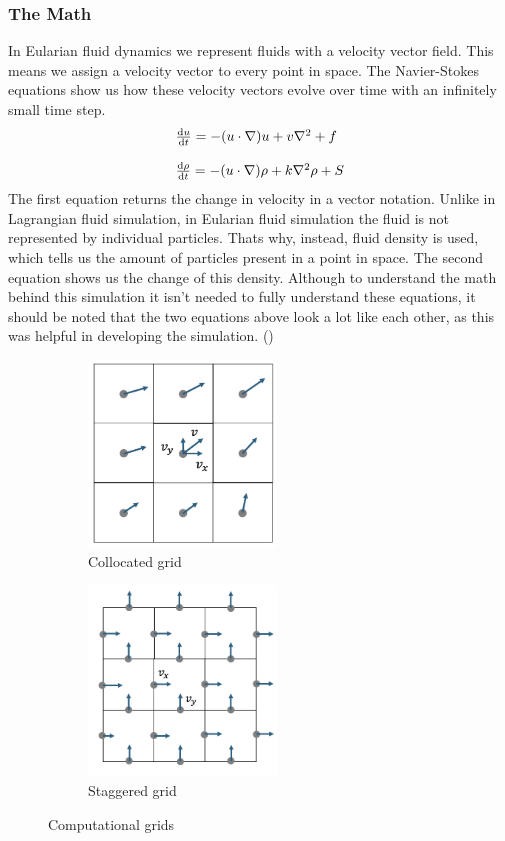 \documentclass[a4paper,12pt]{article}
\begin{document}
\subsubsection{The Math} \label{math}
In Eularian fluid dynamics we represent fluids with a velocity vector field. This means we assign a velocity vector to every point in space.
The Navier-Stokes equations show us how these velocity vectors evolve over time with an infinitely small time step.
\[
\begin{array}{ll}
	\dv{u}{t} = -(u \cdot \nabla)u + v\nabla^2 + f \\
  \\
  \dv{\rho}{t} = -(u \cdot \nabla)\rho + k\nabla^2\rho + S
\end{array}
\]
The first equation returns the change in velocity in a vector notation. 
Unlike in Lagrangian fluid simulation, in Eularian fluid simulation the fluid is not represented by individual particles. 
Thats why, instead, fluid density is used, which tells us the amount of particles present in a point in space. 
The second equation shows us the change of this density. 
Although to understand the math behind this simulation it isn't needed to fully understand these equations, it should be noted that the two equations above look a lot like each other,
as this was helpful in developing the simulation. (\cite{josstam})

\begin{figure}[H]
\centering
\begin{subfigure}{.5\textwidth}
	\centering
	\includegraphics[width=5cm]{resources/collocated_grid_2.png}
	\caption{Collocated grid}
\end{subfigure}%
\begin{subfigure}{.5\textwidth}
	\centering
	\includegraphics[width=5cm]{resources/staggered_grid_2.png}
	\caption{Staggered grid}
\end{subfigure}
\caption{Computational grids}
\end{figure}
\end{document}
